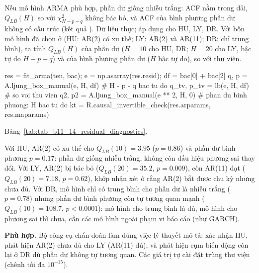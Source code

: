  Nếu mô hình ARMA phù hợp, phần dư giống nhiễu trắng: ACF nằm trong dải, $Q_{LB}(H)$ so với $\chi^2_{H-p-q}$ không bác bỏ, và ACF của bình phương phần dư không có cấu trúc (kết quả ).
 Dữ liệu thực; áp dụng cho HU, LY, DR. Với bốn mô hình đã chọn ở  (HU: AR(2) có xu thế; LY: AR(2) và AR(11); DR: chỉ trung bình), ta tính $Q_{LB}(H)$ của phần dư ($H=10$ cho HU, DR; $H=20$ cho LY, bậc tự do $H-p-q$) và của bình phương phần dư ($H$ bậc tự do), so với thư viện.
\begin{codeblock}
res = fit_arma(ten, bac); e = np.asarray(res.resid); df = bac[0] + bac[2]
q, p = A.ljung_box_manual(e, H, df)              # H - p - q bac tu do
q_tv, p_tv = lb(e, H, df)                         # so voi thu vien
q2, p2 = A.ljung_box_manual(e ** 2, H, 0)         # phan du binh phuong: H bac tu do
kt = R.causal_invertible_check(res.arparams, res.maparams)
\end{codeblock}
 Bảng~\ref{tab:tab_b11_14_residual_diagnostics}.

 Với HU, AR(2) có xu thế cho $Q_{LB}(10)=3.95$ ($p=0.86$) và phần dư bình phương $p=0.17$: phần dư giống nhiễu trắng, không còn dấu hiệu phương sai thay đổi. Với LY, AR(2) bị bác bỏ ($Q_{LB}(20)=35.2$, $p=0.009$), còn AR(11) đạt ($Q_{LB}(20)=7.18$, $p=0.62$), khớp nhận xét ở  rằng AR(2) bắt được chu kỳ nhưng chưa đủ. Với DR, mô hình chỉ có trung bình cho phần dư là nhiễu trắng ($p=0.78$) nhưng phần dư bình phương còn tự tương quan mạnh ($Q_{LB}(10)=108.7$, $p<0.0001$): mô hình cho trung bình là đủ, mô hình cho phương sai thì chưa, cần các mô hình ngoài phạm vi báo cáo (như GARCH).

 \textbf{Phù hợp.} Bộ công cụ chẩn đoán làm đúng việc lý thuyết mô tả: xác nhận HU, phát hiện AR(2) chưa đủ cho LY (AR(11) đủ), và phát hiện cụm biến động còn lại ở DR dù phần dư không tự tương quan. Các giá trị tự cài đặt trùng thư viện (chênh tối đa $10^{-15}$).

